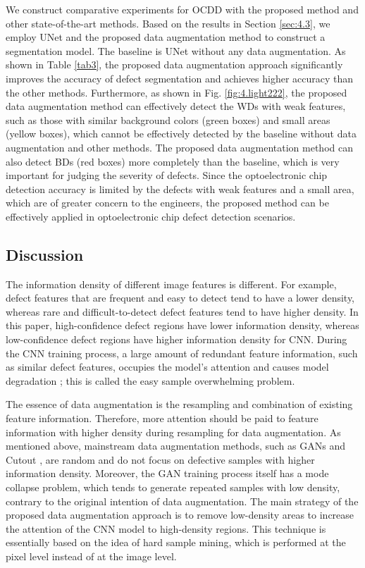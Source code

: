 \documentclass[sn-mathphys]{sn-jnl}%
\theoremstyle{thmstyleone}%
\theoremstyle{thmstyletwo}%
\theoremstyle{thmstylethree}%
\begin{document}
We construct comparative experiments for OCDD with the proposed method and other state-of-the-art methods. 
Based on the results in Section \ref{sec:4.3}, we employ UNet \cite{ronneberger2015u} and the proposed data augmentation method to construct a segmentation model. The baseline is UNet \cite{ronneberger2015u} without any data augmentation.
As shown in Table \ref{tab3}, the proposed data augmentation approach significantly improves the accuracy of defect segmentation and achieves higher accuracy than the other methods. 
Furthermore, as shown in Fig. \ref{fig:4.light222}, the proposed data augmentation method can effectively detect the WDs with weak features, such as those with similar background colors (green boxes) and small areas (yellow boxes), which cannot be effectively detected by the baseline without data augmentation and other methods. The proposed data augmentation method can also detect BDs (red boxes) more completely than the baseline, which is very important for judging the severity of defects. Since the optoelectronic chip detection accuracy is limited by the defects with weak features and a small area, which are of greater concern to the engineers, the proposed method can be effectively applied in optoelectronic chip defect detection scenarios.

\subsection{Discussion}\label{sec:exp.app}
The information density of different image features is different. For example, defect features that are frequent and easy to detect tend to have a lower density, whereas rare and difficult-to-detect defect features tend to have higher density. In this paper, high-confidence defect regions have lower information density, whereas low-confidence defect regions have higher information density for CNN.
During the CNN training process, a large amount of redundant feature information, such as similar defect features, occupies the model's attention and causes model degradation \cite{lin2017focal}; this is called the easy sample overwhelming problem. 

The essence of data augmentation is the resampling and combination of existing feature information. Therefore, more attention should be paid to feature information with higher density during resampling for data augmentation. 
As mentioned above, mainstream data augmentation methods, such as GANs and Cutout \cite{devries2017improved}, are random and do not focus on defective samples with higher information density. Moreover, the GAN training process itself has a mode collapse problem, which tends to generate repeated samples with low density, contrary to the original intention of data augmentation.
The main strategy of the proposed data augmentation approach is to remove low-density areas to increase the attention of the CNN model to high-density regions. This technique is essentially based on the idea of hard sample mining, which is performed at the pixel level instead of at the image level.
\end{document}
